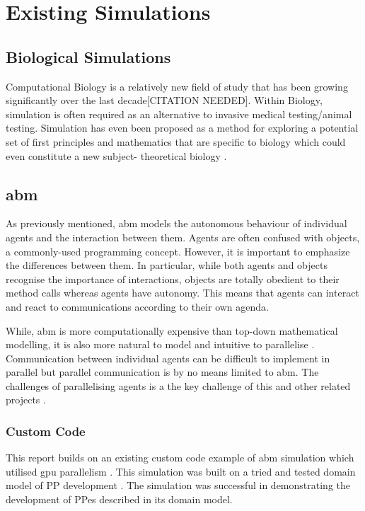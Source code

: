 \documentclass{UoYCSproject}
\begin{document}
\section{Existing Simulations}

\subsection{Biological Simulations}
Computational Biology is a relatively new field of study that has been growing significantly over the last decade[CITATION NEEDED].
Within Biology, simulation is often required as an alternative to invasive medical testing/animal testing.%
Simulation has even been proposed as a method for exploring a potential set of first principles and mathematics that are specific to biology which could even constitute a new subject- theoretical biology \cite{rise_article}.

\subsection{\acrlong{abm}}
\label{abm}
As previously mentioned, \gls{abm} models the autonomous behaviour of individual agents and the interaction between them.
Agents are often confused with objects, a commonly-used programming concept.
However, it is important to emphasize the differences between them.
In particular, while both agents and objects recognise the importance of interactions, objects are totally obedient to their method calls whereas agents have autonomy.
This means that agents can interact and react to communications according to their own agenda.

While, \acrlong{abm} is more computationally expensive than top-down mathematical modelling, it is also more natural to model and intuitive to parallelise \cite{flame_simulation}.
Communication between individual agents can be difficult to implement in parallel but parallel communication is by no means limited to \gls{abm}.
The challenges of parallelising agents is a the key challenge of this and other related projects \cite{andy_proj, jeff_proj}.

\subsubsection{Custom Code}
This report builds on an existing custom code example of \gls{abm} simulation which utilised \gls{gpu} parallelism \cite{phil_diss}.
This simulation was built on a tried and tested domain model of \gls{PP} development \cite{kieran_thesis}.
The simulation was successful in demonstrating the development of \gls{PP}es described in its domain model.
\end{document}
